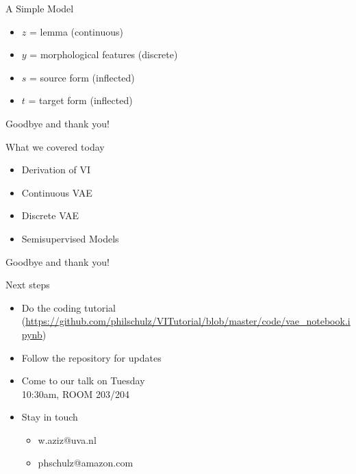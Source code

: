 \documentclass[14pt]{beamer}
\begin{document}
\begin{frame}{A Simple Model \citep{ZhouNeubig:2017}}
\begin{figure}
\center
{}
\end{figure}
\begin{itemize}
\item $ z $ = lemma (continuous)
\item $ y $ = morphological features (discrete)
\item $ s $ = source form (inflected)
\item $ t $ = target form (inflected)
\end{itemize}
\end{frame}

\begin{frame}[allowframebreaks]


\end{frame}

\begin{frame}{Goodbye and thank you!}
\begin{block}{What we covered today}
\begin{itemize}
\item Derivation of VI
\item Continuous VAE
\item Discrete VAE
\item Semisupervised Models
\end{itemize}
\end{block}
\end{frame}

\begin{frame}{Goodbye and thank you!}
\begin{block}{Next steps}
\begin{itemize}
\item Do the coding tutorial (\href{https://github.com/philschulz/VITutorial/blob/master/code/vae_notebook.ipynb}{\url{https://github.com/philschulz/VITutorial/blob/master/code/vae_notebook.ipynb}}) \pause
\item Follow the repository for updates \pause
\item Come to our talk on Tuesday \\
10:30am, ROOM 203/204 \pause
\item Stay in touch
\begin{itemize}
\item w.aziz@uva.nl
\item phschulz@amazon.com
\end{itemize}
\end{itemize}
\end{block}
\end{frame}
\end{document}
